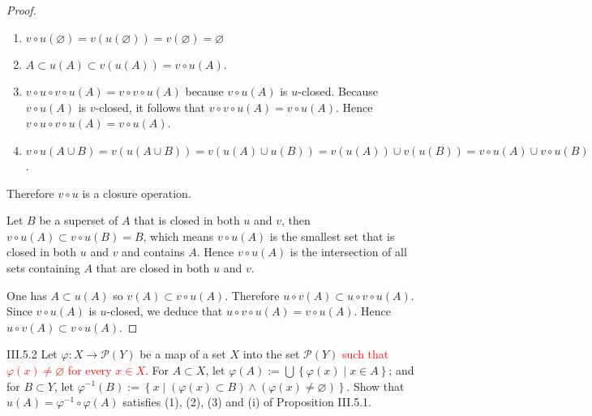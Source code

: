 \begin{proof}
    \begin{enumerate}[label={(\arabic*)}]
        \item \( v\circ u(\varnothing) = v(u(\varnothing)) = v(\varnothing) = \varnothing \)
        \item \( A \subset u(A) \subset v(u(A)) = v\circ u(A) \).
        \item \( v\circ u \circ v\circ u(A) = v\circ v\circ u(A) \) because \( v\circ u(A) \) is \(u\)-closed. Because \( v\circ u(A) \) is \(v\)-closed, it follows that \( v\circ v\circ u(A) = v\circ u(A) \). Hence \( v\circ u \circ v\circ u(A) = v\circ u(A) \).
        \item \( v\circ u(A \cup B) = v(u(A \cup B)) = v(u(A) \cup u(B)) = v(u(A)) \cup v(u(B)) = v\circ u(A) \cup v\circ u(B) \).
    \end{enumerate}

    Therefore \( v\circ u \) is a closure operation.

    Let \(B\) be a superset of \(A\) that is closed in both \(u\) and \(v\), then \( v\circ u(A) \subset v\circ u(B) = B \), which means \( v\circ u(A) \) is the smallest set that is closed in both \(u\) and \(v\) and contains \(A\). Hence \( v\circ u(A) \) is the intersection of all sets containing \(A\) that are closed in both \(u\) and \(v\).

    One has \( A \subset u(A) \) so \( v(A) \subset v\circ u(A) \). Therefore \( u \circ v(A) \subset u\circ v\circ u(A) \). Since \( v\circ u(A) \) is \(u\)-closed, we deduce that \( u\circ v\circ u(A) = v\circ u(A) \). Hence \( u\circ v(A) \subset v\circ u(A) \).
\end{proof}

\begin{problem}{III.5.2}
Let \( \varphi: X \to \mathscr{P}(Y) \) be a map of a set \(X\) into the set \( \mathscr{P}(Y) \) \textcolor{red}{such that \( \varphi(x) \ne \varnothing \) for every \( x \in X \)}. For \( A \subset X \), let \( \varphi(A) := \bigcup \left\{ \varphi(x) \mid x \in A \right\} \); and for \( B \subset Y \), let \( \varphi^{-1}(B) := \left\{ x \mid (\varphi(x) \subset B) \land (\varphi(x) \ne \varnothing) \right\} \). Show that \( u(A) = \varphi^{-1}\circ\varphi(A) \) satisfies (1), (2), (3) and (i) of Proposition III.5.1.
\end{problem}

